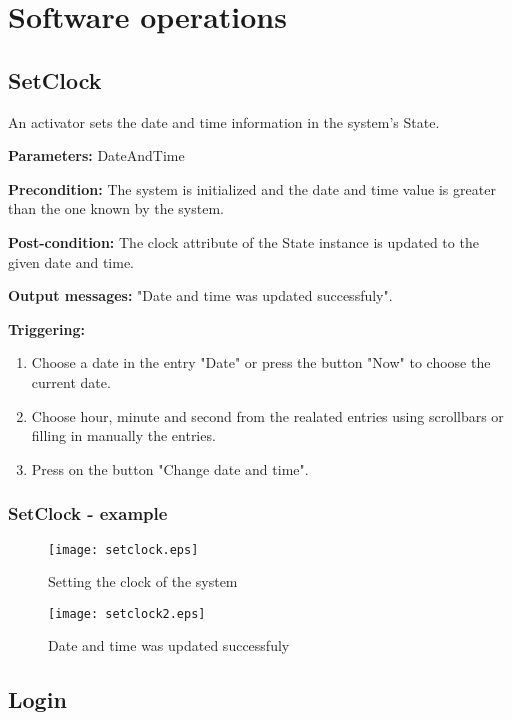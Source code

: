 \chapter{Software operations}
\label{chap:soptware_operations}
\section{SetClock}
\label{operation:CloseCrisis}
An activator sets the date and time information in the system's State.
\begin{description}
	\item \textbf{Parameters:} DateAndTime
	\item \textbf{Precondition:} The system is initialized and the date and time
	value is greater than the one known by the system.
	\item \textbf{Post-condition:} The clock attribute of the State instance is
	updated to the given date and time.
	\item \textbf{Output messages:} "Date and time was updated
	successfuly".
	
	\item \textbf{Triggering:}
	
	\begin{enumerate}
		\item Choose a date in the entry "Date" or press the button "Now" to choose
		the current date.
		\item Choose hour, minute and second from the realated entries using
		scrollbars or filling in manually the entries.
		\item Press on the button "Change date and time".
	\end{enumerate}
\end{description}

\subsection{SetClock - example}

\begin{figure}[h]
    \texttt{[image: setclock.eps]}
	\caption{Setting the clock of the system}
\end{figure}

\begin{figure}[h]
    \texttt{[image: setclock2.eps]}
	\caption{Date and time was updated successfuly}
\end{figure}

\section{Login}
\label{operation:Login}

